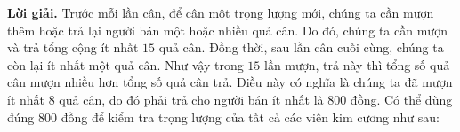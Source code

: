 \begin{multicols}{2}
	\vskip 0.1cm
	{\bf\color{cackithi} Lời giải.} Trước mỗi lần cân, để cân một trọng lượng mới, chúng ta cần mượn thêm hoặc trả lại người bán một hoặc nhiều quả cân. Do đó, chúng ta cần mượn và trả tổng cộng ít nhất $15$ quả cân.
	Đồng thời, sau lần cân cuối cùng, chúng ta còn lại ít nhất một quả cân. Như vậy trong $15$ lần mượn, trả này thì tổng số quả cân mượn nhiều hơn tổng số quả cân trả. Điều này có nghĩa là chúng ta đã mượn ít nhất $8$ quả cân, do đó phải trả cho người bán ít nhất là $800$ đồng.
	\vskip 0.1cm
	Có thể dùng đúng $800$ đồng để kiểm tra trọng lượng của tất cả các viên kim cương như sau:
	\begin{table}[H]
		\vspace*{-5pt}
		\centering
\end{table}
\end{multicols}
